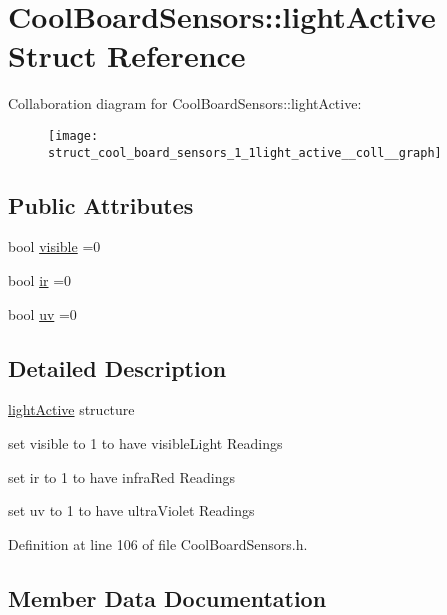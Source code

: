 \hypertarget{struct_cool_board_sensors_1_1light_active}{}\section{Cool\+Board\+Sensors\+:\+:light\+Active Struct Reference}
\label{struct_cool_board_sensors_1_1light_active}


Collaboration diagram for Cool\+Board\+Sensors\+:\+:light\+Active\+:
\nopagebreak
\begin{figure}[H]
\begin{center}
\leavevmode
\texttt{[image: struct\_cool\_board\_sensors\_1\_1light\_active\_\_coll\_\_graph]}
\end{center}
\end{figure}
\subsection*{Public Attributes}
\begin{DoxyCompactItemize}
\item 
bool \hyperlink{struct_cool_board_sensors_1_1light_active_a9c351100969d0dc055ad2e6712cc7ac8}{visible} =0
\item 
bool \hyperlink{struct_cool_board_sensors_1_1light_active_a4c21258d3c89c6292740d6deb10f9dcc}{ir} =0
\item 
bool \hyperlink{struct_cool_board_sensors_1_1light_active_a0e6cfc311425a31f32c32fc3b834ffb8}{uv} =0
\end{DoxyCompactItemize}


\subsection{Detailed Description}
\hyperlink{struct_cool_board_sensors_1_1light_active}{light\+Active} structure

set visible to 1 to have visible\+Light Readings

set ir to 1 to have infra\+Red Readings

set uv to 1 to have ultra\+Violet Readings 

Definition at line 106 of file Cool\+Board\+Sensors.\+h.



\subsection{Member Data Documentation}
\mbox{\label{struct_cool_board_sensors_1_1light_active_a4c21258d3c89c6292740d6deb10f9dcc}} 
